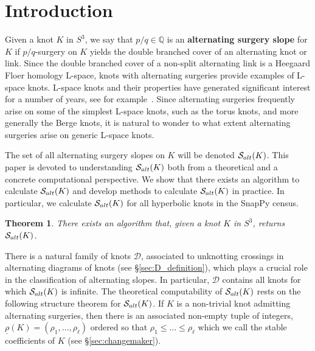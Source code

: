 \documentclass{amsart} %
\newcommand{\D}{\mathcal{D}}
\newcommand{\Q}{\mathbb{Q}}
\newcommand{\Salt}{\mathcal{S}_{\rm alt}}
\theoremstyle{thm}
\newtheorem{thm}[Theorem]{Theorem}
\theoremstyle{definition}
\numberwithin{equation}{section}
\begin{document}
\section{Introduction}
Given a knot $K$ in $S^3$, we say that $p/q\in \Q$ is an \textbf{alternating surgery slope} for $K$ if $p/q$-surgery on $K$ yields the double branched cover of an alternating knot or link. Since the double branched cover of a non-split alternating link is a Heegaard Floer homology L-space, knots with alternating surgeries provide examples of L-space knots. L-space knots and their properties have generated significant interest for a number of years, see for example~\cite{OS05,OS05b,Gr14,Greene2015genusbounds,GreeneLRP}. Since alternating surgeries frequently arise on some of the simplest L-space knots, such as the torus knots, and more generally the Berge knots, it is natural to wonder to what extent alternating surgeries arise on generic L-space knots.

The set of all alternating surgery slopes on $K$ will be denoted $\Salt(K)$. This paper is devoted to understanding $\Salt(K)$ both from a theoretical and a concrete computational perspective. We show that there exists an algorithm to calculate $\Salt(K)$ and develop methods to calculate $\Salt(K)$ in practice. In particular, we calculate $\Salt(K)$ for all hyperbolic knots in the SnapPy census.
\newcommand{\thmcomputable}{There exists an algorithm that, given a knot $K$ in $S^3$, returns $\Salt(K)$.}
\begin{thm}\label{thm:computable}
\thmcomputable
\end{thm}

There is a natural family of knots $\D$, associated to unknotting crossings in alternating diagrams of knots (see \S\ref{sec:D_definition}), which plays a crucial role in the classification of alternating slopes. In particular, $\D$ contains all knots for which $\Salt(K)$ is infinite. The theoretical computability of $\Salt(K)$ rests on the following structure theorem for $\Salt(K)$. If $K$ is a non-trivial knot admitting alternating surgeries, then there is an associated non-empty tuple of integers, $\underline{\rho}(K)=(\rho_1, \dots, \rho_\ell)$ ordered so that $\rho_1\leq \dots \leq \rho_\ell$ which we call the stable coefficients of $K$ (see \S\ref{sec:changemaker}).
\end{document}
